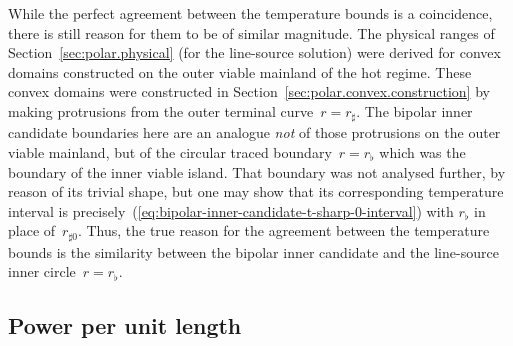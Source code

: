While the perfect agreement between the temperature bounds is a coincidence,
there is still reason for them to be of similar magnitude.
The physical ranges of Section~\ref{sec:polar.physical}
(for the line-source solution)
were derived for convex domains
constructed on the outer viable mainland of the hot regime.
These convex domains were constructed
in Section~\ref{sec:polar.convex.construction}
by making protrusions from the outer terminal curve~$r = r_\sharp$.
The bipolar inner candidate boundaries here are an analogue
\emph{not} of those protrusions on the outer viable mainland,
but of the circular traced boundary~$r = r_\flat$
which was the boundary of the inner viable island.
That boundary was not analysed further, by reason of its trivial shape,
but one may show that its corresponding temperature interval
is precisely~(\ref{eq:bipolar-inner-candidate-t-sharp-0-interval})
with $r_\flat$ in place of~$r_{\sharp 0}$.
Thus, the true reason for the agreement between the temperature bounds
is the similarity
between the bipolar inner candidate
and the line-source inner circle~$r = r_\flat$.

\subsection{Power per unit length}
\label{sec:bipolar.physical.power}

